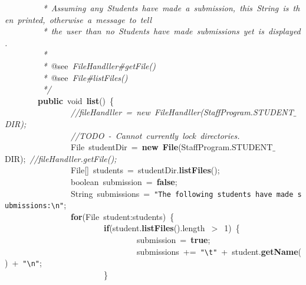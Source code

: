 \mbox{}\textit{\ \ \ \ \ \ \ \ \ *\ Assuming\ any\ Students\ have\ made\ a\ submission,\ this\ String\ is\ then\ printed,\ otherwise\ a\ message\ to\ tell} \\
\mbox{}\textit{\ \ \ \ \ \ \ \ \ *\ the\ user\ than\ no\ Students\ have\ made\ submissions\ yet\ is\ displayed.} \\
\mbox{}\textit{\ \ \ \ \ \ \ \ \ *} \\
\mbox{}\textit{\ \ \ \ \ \ \ \ \ *\ }@see\textit{\ FileHandller\#getFile()} \\
\mbox{}\textit{\ \ \ \ \ \ \ \ \ *\ }@see\textit{\ File\#listFiles()} \\
\mbox{}\textit{\ \ \ \ \ \ \ \ \ */} \\
\mbox{}\ \ \ \ \ \ \ \ \textbf{public}\ void\ \textbf{list}()\ \{ \\
\mbox{}\ \ \ \ \ \ \ \ \ \ \ \ \ \ \ \ \textit{//fileHandller\ =\ new\ FileHandller(StaffProgram.STUDENT$\_$DIR);} \\
\mbox{}\ \ \ \ \ \ \ \ \ \ \ \ \ \ \ \ \textit{//TODO\ -\ Cannot\ currently\ lock\ directories.} \\
\mbox{}\ \ \ \ \ \ \ \ \ \ \ \ \ \ \ \ File\ studentDir\ =\ \textbf{new}\ \textbf{File}(StaffProgram.STUDENT$\_$DIR);\ \textit{//fileHandller.getFile();} \\
\mbox{}\ \ \ \ \ \ \ \ \ \ \ \ \ \ \ \ File[]\ students\ =\ studentDir.\textbf{listFiles}(); \\
\mbox{}\ \ \ \ \ \ \ \ \ \ \ \ \ \ \ \ boolean\ submission\ =\ \textbf{false}; \\
\mbox{}\ \ \ \ \ \ \ \ \ \ \ \ \ \ \ \ String\ submissions\ =\ \texttt{"{}The\ following\ students\ have\ made\ submissions:}\texttt{\textbackslash{}n}\texttt{"{}}; \\
\mbox{}\ \ \ \ \ \ \ \ \ \ \ \ \ \ \ \ \textbf{for}(File\ student:students)\ \{ \\
\mbox{}\ \ \ \ \ \ \ \ \ \ \ \ \ \ \ \ \ \ \ \ \ \ \ \ \textbf{if}(student.\textbf{listFiles}().length\ $>$\ 1)\ \{ \\
\mbox{}\ \ \ \ \ \ \ \ \ \ \ \ \ \ \ \ \ \ \ \ \ \ \ \ \ \ \ \ \ \ \ \ submission\ =\ \textbf{true}; \\
\mbox{}\ \ \ \ \ \ \ \ \ \ \ \ \ \ \ \ \ \ \ \ \ \ \ \ \ \ \ \ \ \ \ \ submissions\ +=\ \texttt{"{}}\texttt{\textbackslash{}t}\texttt{"{}}\ +\ student.\textbf{getName}()\ +\ \texttt{"{}}\texttt{\textbackslash{}n}\texttt{"{}}; \\
\mbox{}\ \ \ \ \ \ \ \ \ \ \ \ \ \ \ \ \ \ \ \ \ \ \ \ \} \\
